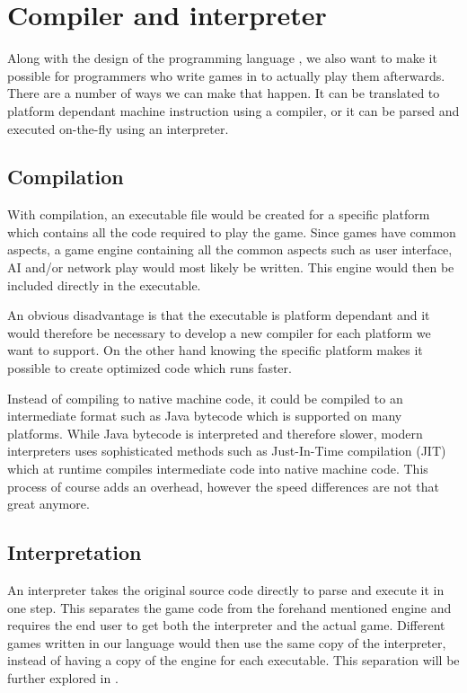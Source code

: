 \section{Compiler and interpreter}
Along with the design of the programming language \productname{}, we also want
to make it possible for programmers who write games in \productname{} to
actually play them afterwards. 
There are a number of ways we can make that happen. It can be translated to
platform dependant machine instruction using a compiler, or it can be parsed and
executed on-the-fly using an interpreter.

\subsection{Compilation}
With compilation, an executable file would be created for a specific platform
which contains all the code required to play the game.  Since games have common
aspects, a game engine containing all the common aspects such as user interface,
AI and/or network play would most likely be written.  This engine would then be
included directly in the executable.

An obvious disadvantage is that the executable is platform dependant and it
would therefore be necessary to develop a new compiler for each platform we want
to support.  On the other hand knowing the specific platform makes it possible
to create optimized code which runs faster.

Instead of compiling to native machine code, it could be compiled to an
intermediate format such as Java bytecode which is supported on many platforms.
While Java bytecode is interpreted and therefore slower, modern interpreters
uses sophisticated methods such as Just-In-Time compilation (JIT) which at
runtime compiles intermediate code into native machine code.  This process of
course adds an overhead, however the speed differences are not that great
anymore.\cite{java-speed}

\subsection{Interpretation}
An interpreter takes the original source code directly to parse and execute it
in one step.  This separates the game code from the forehand mentioned engine
and requires the end user to get both the interpreter and the actual game.
Different games written in our language would then use the same copy of the
interpreter, instead of having a copy of the engine for each executable. This
separation will be further explored in .

